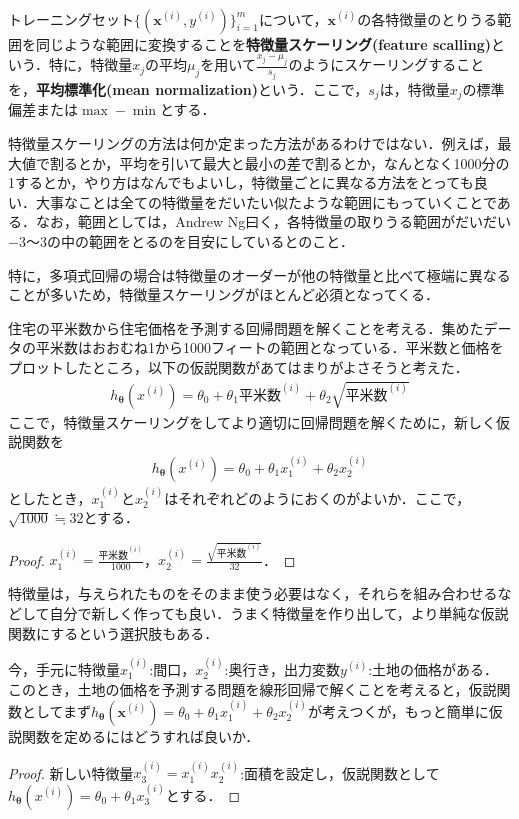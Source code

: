 \begin{defi}[特徴量スケーリング]
　\\
トレーニングセット$\{({\bm x}^{(i)},y^{(i)})\}_{i=1}^m$について，${\bm x}^{(i)}$の各特徴量のとりうる範囲を同じような範囲に変換することを{\bf 特徴量スケーリング(feature scalling)}という．特に，特徴量$x_j$の平均$\mu_j$を用いて$\frac{x_j-\mu_j}{s_j}$のようにスケーリングすることを，{\bf 平均標準化(mean normalization)}という．ここで，$s_j$は，特徴量$x_j$の標準偏差または$\max - \min$とする．
\end{defi}
\begin{rem}
特徴量スケーリングの方法は何か定まった方法があるわけではない．例えば，最大値で割るとか，平均を引いて最大と最小の差で割るとか，なんとなく1000分の1するとか，やり方はなんでもよいし，特徴量ごとに異なる方法をとっても良い．大事なことは全ての特徴量をだいたい似たような範囲にもっていくことである．なお，範囲としては，Andrew Ng曰く，各特徴量の取りうる範囲がだいだい$-3〜3$の中の範囲をとるのを目安にしているとのこと．
\end{rem}

特に，多項式回帰の場合は特徴量のオーダーが他の特徴量と比べて極端に異なることが多いため，特徴量スケーリングがほとんど必須となってくる．

\begin{qu}
住宅の平米数から住宅価格を予測する回帰問題を解くことを考える．集めたデータの平米数はおおむね1から1000フィートの範囲となっている．平米数と価格をプロットしたところ，以下の仮説関数があてはまりがよさそうと考えた．
\begin{align*}
h_{{\bm \theta}}(x^{(i)})=\theta_0+\theta_1 平米数^{(i)}+\theta_2 \sqrt{平米数^{(i)}}
\end{align*}
ここで，特徴量スケーリングをしてより適切に回帰問題を解くために，新しく仮説関数を
\begin{align*}
h_{{\bm \theta}}(x^{(i)})=\theta_0+\theta_1 x_1^{(i)}+\theta_2 x_2^{(i)}
\end{align*}
としたとき，$x_1^{(i)}$と$x_2^{(i)}$はそれぞれどのようにおくのがよいか．ここで，$\sqrt{1000}\fallingdotseq 32$とする．
\end{qu}
\begin{proof}
$x_1^{(i)}=\frac{平米数^{(i)}}{1000}$，$x_2^{(i)}=\frac{\sqrt{平米数^{(i)}}}{32}$．
\end{proof}

特徴量は，与えられたものをそのまま使う必要はなく，それらを組み合わせるなどして自分で新しく作っても良い．うまく特徴量を作り出して，より単純な仮説関数にするという選択肢もある．

\begin{qu}
今，手元に特徴量$x_1^{(i)}$:間口，$x_2^{(i)}$:奥行き，出力変数$y^{(i)}$:土地の価格がある．このとき，土地の価格を予測する問題を線形回帰で解くことを考えると，仮説関数としてまず$h_{{\bm \theta}}({\bm x}^{(i)})=\theta_0+\theta_1 x_1^{(i)}+\theta_2 x_2^{(i)}$が考えつくが，もっと簡単に仮説関数を定めるにはどうすれば良いか．
\end{qu}
\begin{proof}
新しい特徴量$x_3^{(i)}=x_1^{(i)}x_2^{(i)}$:面積を設定し，仮説関数として$h_{{\bm \theta}}(x^{(i)})=\theta_0+\theta_1 x_3^{(i)}$とする．
\end{proof}
